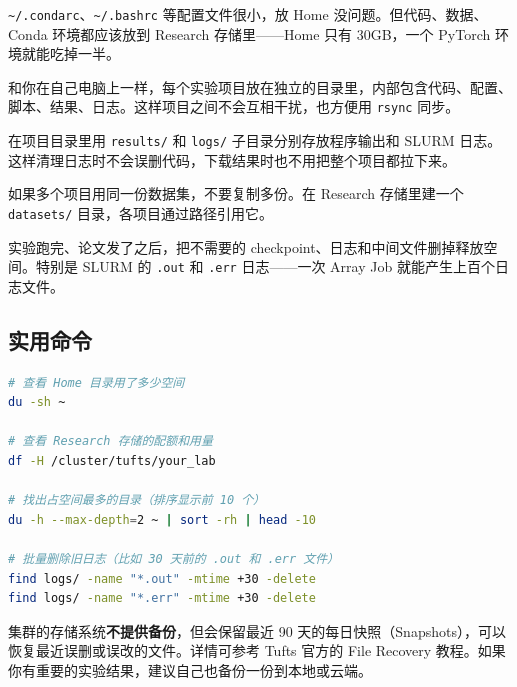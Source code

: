 \begin{description}[style=nextline,leftmargin=2em]
  \item[Home 目录只放配置文件]
    \texttt{\textasciitilde/.condarc}、\texttt{\textasciitilde/.bashrc} 等配置文件很小，放 Home 没问题。但代码、数据、Conda 环境都应该放到 Research 存储里——Home 只有 30GB，一个 PyTorch 环境就能吃掉一半。

  \item[每个项目一个独立目录]
    和你在自己电脑上一样，每个实验项目放在独立的目录里，内部包含代码、配置、脚本、结果、日志。这样项目之间不会互相干扰，也方便用 \texttt{rsync} 同步。

  \item[结果和日志与代码分开]
    在项目目录里用 \texttt{results/} 和 \texttt{logs/} 子目录分别存放程序输出和 SLURM 日志。这样清理日志时不会误删代码，下载结果时也不用把整个项目都拉下来。

  \item[数据集单独存放、项目间共享]
    如果多个项目用同一份数据集，不要复制多份。在 Research 存储里建一个 \texttt{datasets/} 目录，各项目通过路径引用它。

  \item[定期清理]
    实验跑完、论文发了之后，把不需要的 checkpoint、日志和中间文件删掉释放空间。特别是 SLURM 的 \texttt{.out} 和 \texttt{.err} 日志——一次 Array Job 就能产生上百个日志文件。
\end{description}

\subsection{实用命令}

\begin{lstlisting}[language=bash]
# 查看 Home 目录用了多少空间
du -sh ~

# 查看 Research 存储的配额和用量
df -H /cluster/tufts/your_lab

# 找出占空间最多的目录（排序显示前 10 个）
du -h --max-depth=2 ~ | sort -rh | head -10

# 批量删除旧日志（比如 30 天前的 .out 和 .err 文件）
find logs/ -name "*.out" -mtime +30 -delete
find logs/ -name "*.err" -mtime +30 -delete
\end{lstlisting}

\begin{warnbox}
集群的存储系统\textbf{不提供备份}，但会保留最近 90 天的每日快照（Snapshots），可以恢复最近误删或误改的文件。详情可参考 Tufts 官方的 File Recovery 教程。如果你有重要的实验结果，建议自己也备份一份到本地或云端。
\end{warnbox}
